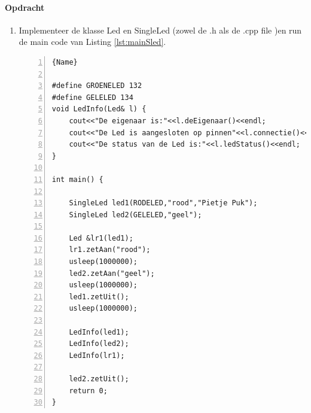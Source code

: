 \paragraph{Opdracht} 
\begin{enumerate}[label=(\alph*)]
\item
Implementeer de klasse Led en SingleLed (zowel de .h als de .cpp file )en run de main code van Listing \ref{lst:mainSled}.

\begin{lstlisting}[caption=main functie om de klasse SingleLed te testen. ,frame=trbl,firstnumber=1,numbers=left,label={lst:mainSled}]{Name}

#define GROENELED 132
#define GELELED 134
void LedInfo(Led& l) {
	cout<<"De eigenaar is:"<<l.deEigenaar()<<endl;
	cout<<"De Led is aangesloten op pinnen"<<l.connectie()<<endl;
	cout<<"De status van de Led is:"<<l.ledStatus()<<endl;
}

int main() {
	
	SingleLed led1(RODELED,"rood","Pietje Puk");
	SingleLed led2(GELELED,"geel");
	
	Led &lr1(led1);
	lr1.zetAan("rood");
	usleep(1000000);
	led2.zetAan("geel"); 
	usleep(1000000);
	led1.zetUit();
	usleep(1000000);
	
	LedInfo(led1);
	LedInfo(led2);
	LedInfo(lr1);
	
	led2.zetUit();
	return 0;
}

\end{lstlisting}


\end{enumerate}
